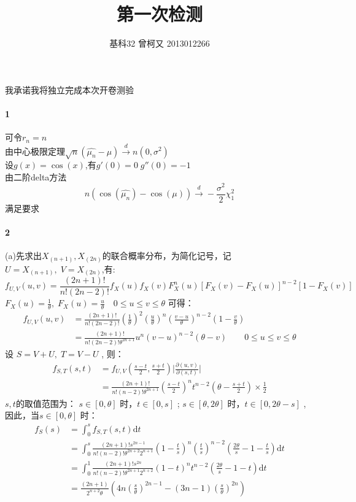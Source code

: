 \documentclass[11pt,a4paper]{ctexart}
\title{第一次检测}
\author{基科32 曾柯又 2013012266}
\begin{document}
\abovedisplayskip=5pt
\belowdisplayskip=5pt
\abovedisplayshortskip=0pt
\belowdisplayshortskip=0pt
\maketitle
我承诺我将独立完成本次开卷测验
\paragraph{1}
可令$r_n = n$\\
由中心极限定理$\sqrt{n}(\hat{\mu_n} - \mu) \overset{d}{\to} n(0,\sigma^2)$\\
设\(g(x) = \cos(x)\),有\( g'(0) = 0 \; g''(0) = -1\)\\
由二阶delta方法\[ n(\cos(\hat{\mu_n}) - \cos(\mu) ) \overset{d}{\to} -\frac{\sigma^2}{2}\chi^2_1 \]
满足要求
 \paragraph{2}
(a)先求出\(X_{(n+1)} , X_{(2n)}\)的联合概率分布，为简化记号，记\(U = X_{(n+1)},\;V = X_{(2n)}\),有:
 \[ f_{U,V}(u,v) = \frac{(2n + 1)!}{n!(2n - 2)!}f_X(u)f_X(v)F_X^n(u)[F_X(v) - F_X(u)]^{n - 2}[1 - F_X(v)]\]
 \(F_X(u) = \frac{1}{\theta},\;F_X(u) = \frac{u}{\theta}\quad 0 \leq u \leq v \leq \theta\)  可得：
 \begin{equation*}
\begin{split}
f_{U,V}(u,v) & = \frac{(2n + 1)!}{n!(2n - 2)!}(\frac{1}{\theta})^2(\frac{u}{\theta})^n(\frac{v - u}{\theta})^{n - 2}(1 -\frac{v}{\theta} )\\
& = \frac{(2n + 1)!}{n!(2n - 2)!\theta^{2n + 1}}u^n(v - u)^{n - 2}(\theta - v)  \qquad 0 \leq u \leq v \leq \theta 
\end{split}
 \end{equation*}
 设 \(S =  V + U ,\; T = V - U\) , 则：
 \begin{equation*}
 \begin{split}
 f_{S,T}(s,t) & = f_{U,V}(\frac{s - t}{2},\frac{s + t}{2})\Big|\frac{\partial(u,v)}{\partial(s,t)}\Big|\\
 & = \frac{(2n + 1)!}{n!(n-2)!\theta^{2n + 1}}(\frac{s - t}{2})^nt^{n - 2}(\theta - \frac{s + t}{2})\times\frac{1}{2}
 \end{split}
 \end{equation*}
 $s,t$的取值范围为： 
\(s \in [0, \theta]\) 时，\( t \in [0,s]\) ; \(s \in [\theta, 2\theta]\) 时，\( t \in [0,2\theta - s]\) ,因此，当\(s \in [0, \theta]\) 时：
\begin{equation*}
\begin{split}
f_S(s) & = \int_{0}^{s}f_{S,T}(s,t)\mathrm{d}t \\
&= \int_{0}^{s}\frac{(2n + 1)!s^{2n - 1}}{n!(n-2)!\theta^{2n + 2}2^{n + 1}}(1 - \frac{t}{s})^n(\frac{t}{s})^{n - 2}(\frac{2\theta}{s} - 1 -  \frac{t}{s})\mathrm{d}t\\
& = \int_{0}^{1}\frac{(2n + 1)!s^{2n}}{n!(n-2)!\theta^{2n + 1}2^{n + 2}}(1 - t)^nt^{n - 2}(\frac{2\theta}{s} - 1 -  t)\mathrm{d}t\\
& = \frac{(2n + 1)}{2^{n + 2}\theta}(4n(\frac{s}{\theta})^{2n - 1} - (3n - 1)(\frac{s}{\theta})^{2n})
\end{split}
\end{equation*}
\end{document}
